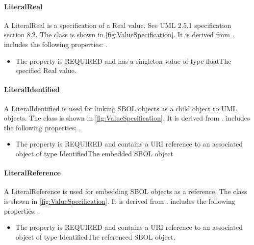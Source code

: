 \paragraph{LiteralReal}%
\label{sec:uml:LiteralReal}%
A LiteralReal is a specification of a Real value. See UML 2.5.1 specification section 8.2.%
\linebreak%
\linebreak%
The  class is shown in \ref{fig:ValueSpecification}. It is derived from .%
 includes the following properties: . %
\begin{itemize}%
\item%
The  property is REQUIRED and has a singleton value of type floatThe specified Real value.%
\end{itemize}%
\paragraph{LiteralIdentified}%
\label{sec:uml:LiteralIdentified}%
A LiteralIdentified is used for linking SBOL objects as a child object to UML objects.%
\linebreak%
\linebreak%
The  class is shown in \ref{fig:ValueSpecification}. It is derived from .%
 includes the following properties: . %
\begin{itemize}%
\item%
The  property is REQUIRED and contains a URI reference to an associated object of type IdentifiedThe embedded SBOL object%
\end{itemize}%
\paragraph{LiteralReference}%
\label{sec:uml:LiteralReference}%
A LiteralReference is used for embedding SBOL objects as a reference.%
\linebreak%
\linebreak%
The  class is shown in \ref{fig:ValueSpecification}. It is derived from .%
 includes the following properties: . %
\begin{itemize}%
\item%
The  property is REQUIRED and contains a URI reference to an associated object of type IdentifiedThe referenced SBOL object.%
\end{itemize}%
